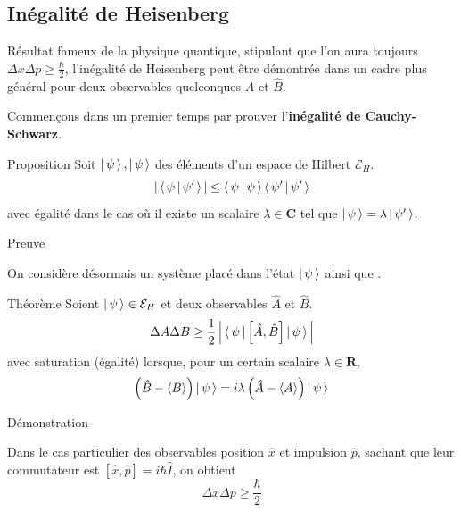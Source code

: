     \subsection{Inégalité de Heisenberg}

        Résultat fameux de la physique quantique, stipulant que l’on aura toujours $\Delta x \Delta p \geq \frac{\hbar}{2}$, l’inégalité de Heisenberg peut être démontrée dans un cadre plus général pour deux observables quelconques $\hat{A}$ et $\hat{B}$.

        Commençons dans un premier temps par prouver l’\textbf{inégalité de Cauchy-Schwarz}.

        \begin{omed}{Proposition}
            Soit $\left| \, \psi \, \right>, \left| \, \psi \, \right>$ des éléments d’un espace de Hilbert $\mathcal{E}_H$. 
            \[ \left\lvert \, \left< \, \psi \, \middle| \, \psi' \, \right> \, \right\rvert \leq \left< \, \psi \, \middle| \, \psi \, \right> \left< \, \psi' \, \middle| \, \psi' \, \right> \]
            avec égalité dans le cas où il existe un scalaire $\lambda \in \mathbf{C}$ tel que $\left| \, \psi \, \right> = \lambda \left| \, \psi' \, \right>$.
        \end{omed}

        \begin{demo}{Preuve}
            
        \end{demo}

        On considère désormais un système placé dans l’état $\left| \, \psi \, \right> $ ainsi que . 

        \begin{omed}{Théorème}
            Soient $\left| \, \psi \, \right> \in \mathcal{E}_H$ et deux observables $\hat{A}$ et $\hat{B}$.
            \[ \Delta A \Delta B \geq \frac{1}{2} \left\lvert \, \left< \, \psi \, \right| \left[\hat{A}, \hat{B}\right] \left| \, \psi \, \right> \, \right\rvert \]
            avec saturation (égalité) lorsque, pour un certain scalaire $\lambda \in \mathbf{R}$, 
            \[ \left(\hat{B} - \left<B\right>\right) \left| \, \psi \, \right> = i \lambda \left(\hat{A} - \left<A\right>\right) \left| \, \psi \, \right> \]
        \end{omed}

        \begin{demo}{Démonstration}
            
        \end{demo}

        Dans le cas particulier des observables position $\hat{x}$ et impulsion $\hat{p}$, sachant que leur commutateur est $\left[ \hat{x}, \hat{p} \right] = i \hbar \hat{I}$, on obtient 
        \[ \Delta x \Delta p \geq \frac{\hbar}{2} \]
        
